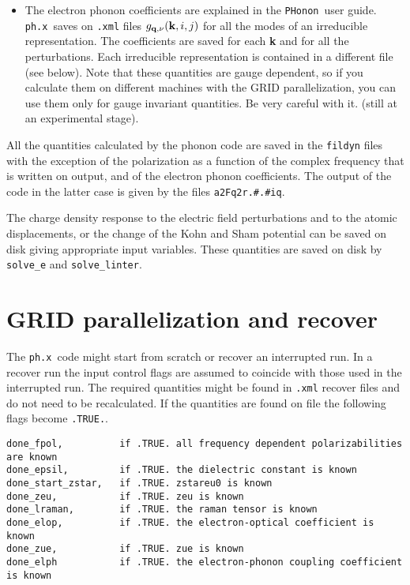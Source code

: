 \documentclass[12pt,a4paper]{article}
\def\phx{\texttt{ph.x}}
\def\PHonon{\texttt{PHonon}}
\begin{document}
\begin{itemize}
\item
The electron phonon coefficients are explained in the \PHonon\ user guide. 
\phx\ saves on \texttt{.xml} files $g_{{\bf q},\nu} ({\bf k},i,j)$ 
for all the modes of an irreducible representation. The coefficients are
saved for each {\bf k} and for all the perturbations. Each irreducible
representation is contained in a different file (see below). Note that 
these quantities are gauge dependent, so if you calculate them on 
different machines with the GRID parallelization, you can use them only 
for gauge invariant quantities. Be very careful with it. (still at an 
experimental stage).

\end{itemize}

All the quantities calculated by the phonon code are saved in the
\texttt{fildyn} files with the exception of the
polarization as a function of the complex frequency that is written 
on output, and of the electron phonon coefficients. The output of the
code in the latter case is given by the files {\tt a2Fq2r.\#.\#iq}.

The charge density response to the electric field perturbations and
to the atomic displacements, or the change of the Kohn and Sham
potential can be saved on disk giving appropriate input variables.
These quantities are saved on disk by \texttt{solve\_e} and 
\texttt{solve\_linter}.


\section{GRID parallelization and recover}

The \phx\ code might start from scratch or recover an interrupted run. 
In a recover run the input control flags are assumed to coincide with 
those used in the interrupted run. The required quantities might be
found in \texttt{.xml} recover files and do not need to be recalculated. 
If the quantities are found on file the following flags become 
\texttt{.TRUE.}.

\begin{verbatim}
done_fpol,          if .TRUE. all frequency dependent polarizabilities are known
done_epsil,         if .TRUE. the dielectric constant is known
done_start_zstar,   if .TRUE. zstareu0 is known
done_zeu,           if .TRUE. zeu is known
done_lraman,        if .TRUE. the raman tensor is known
done_elop,          if .TRUE. the electron-optical coefficient is known
done_zue,           if .TRUE. zue is known
done_elph           if .TRUE. the electron-phonon coupling coefficient is known
\end{verbatim}
\end{document}
